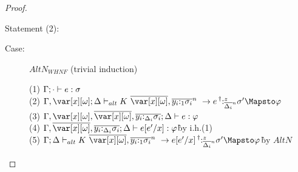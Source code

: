 \begin{proof}
\begin{description}

\end{description}

Statement (2):



\begin{description}

\item[Case:] $AltN_{WHNF}$ (trivial induction)
\begin{tabbing}
    (1) $\Gamma; \cdot \vdash e : \sigma$\\
    (2) $\G,\xo;\D \vdash_{alt} \konstructor~\to e \prescript{\dag}{}{:^z_{\ov{\D_i}^n}} \s' \Mapsto \vp$\\
    (3) $\G,\xo,\ov{\xo},\ov{y_i{:}_{\D_i}\s_i}; \D \vdash e : \vp $\\
    (4) $\G,\ov{\xo},\ov{y_i{:}_{\D_i}\s_i}; \D \vdash e[e'/x] : \vp $\` by i.h.(1)\\
    (5) $\G;\D \vdash_{alt} \konstructor~\to e[e'/x] \prescript{\dag}{}{:^z_{\ov{\D_i}^n}} \s' \Mapsto \vp$\` by $AltN$\\
\end{tabbing}


\end{description}
\end{proof}
